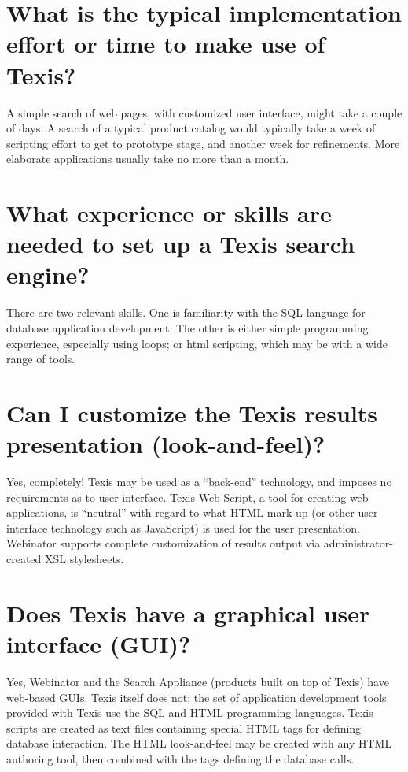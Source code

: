 \section{What is the typical implementation effort or time to make use of Texis? }

A simple search of web pages, with customized user interface, might
take a couple of days.  A search of a typical product catalog would
typically take a week of scripting effort to get to prototype stage,
and another week for refinements. More elaborate applications usually
take no more than a month.

\section{What experience or skills are needed to set up a Texis search engine? }

There are two relevant skills.  One is familiarity with the SQL
language for database application development.  The other is either
simple programming experience, especially using loops; or html
scripting, which may be with a wide range of tools.

\section{Can I customize the Texis results presentation (look-and-feel)? }

Yes, completely!  Texis may be used as a ``back-end'' technology, and
imposes no requirements as to user interface.  Texis Web Script, a
tool for creating web applications, is ``neutral'' with regard to what
HTML mark-up (or other user interface technology such as JavaScript)
is used for the user presentation.  Webinator supports complete
customization of results output via administrator-created XSL
stylesheets.

\section{Does Texis have a graphical user interface (GUI)? }

Yes, Webinator and the Search Appliance (products built on top of
Texis) have web-based GUIs.  Texis itself does not; the set of
application development tools provided with Texis use the SQL and HTML
programming languages.  Texis scripts are created as text files
containing special HTML tags for defining database interaction.  The
HTML look-and-feel may be created with any HTML authoring tool, then
combined with the tags defining the database calls.

